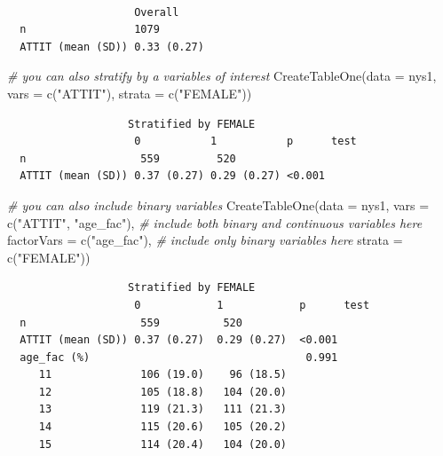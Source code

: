 \documentclass[
  letterpaper,
  DIV=11,
  numbers=noendperiod]{scrreprt}
\newenvironment{Shaded}{}{}
\newcommand{\AttributeTok}[1]{\textcolor[rgb]{0.49,0.56,0.16}{#1}}
\newcommand{\CommentTok}[1]{\textcolor[rgb]{0.38,0.63,0.69}{\textit{#1}}}
\newcommand{\FunctionTok}[1]{\textcolor[rgb]{0.02,0.16,0.49}{#1}}
\newcommand{\NormalTok}[1]{#1}
\newcommand{\StringTok}[1]{\textcolor[rgb]{0.25,0.44,0.63}{#1}}
\begin{document}
\begin{verbatim}
                   
                    Overall    
  n                 1079       
  ATTIT (mean (SD)) 0.33 (0.27)
\end{verbatim}

\begin{Shaded}
\begin{Highlighting}[]
\CommentTok{\# you can also stratify by a variables of interest}
  \FunctionTok{CreateTableOne}\NormalTok{(}\AttributeTok{data =}\NormalTok{ nys1,}
                 \AttributeTok{vars =} \FunctionTok{c}\NormalTok{(}\StringTok{"ATTIT"}\NormalTok{), }
                 \AttributeTok{strata =} \FunctionTok{c}\NormalTok{(}\StringTok{"FEMALE"}\NormalTok{))}
\end{Highlighting}
\end{Shaded}

\begin{verbatim}
                   Stratified by FEMALE
                    0           1           p      test
  n                  559         520                   
  ATTIT (mean (SD)) 0.37 (0.27) 0.29 (0.27) <0.001     
\end{verbatim}

\begin{Shaded}
\begin{Highlighting}[]
\CommentTok{\# you can also include binary variables}
  \FunctionTok{CreateTableOne}\NormalTok{(}\AttributeTok{data =}\NormalTok{ nys1, }
                 \AttributeTok{vars =} \FunctionTok{c}\NormalTok{(}\StringTok{"ATTIT"}\NormalTok{, }\StringTok{"age\_fac"}\NormalTok{),  }\CommentTok{\# include both binary and continuous variables here}
                 \AttributeTok{factorVars =} \FunctionTok{c}\NormalTok{(}\StringTok{"age\_fac"}\NormalTok{), }\CommentTok{\# include only binary variables here}
                 \AttributeTok{strata =} \FunctionTok{c}\NormalTok{(}\StringTok{"FEMALE"}\NormalTok{))}
\end{Highlighting}
\end{Shaded}

\begin{verbatim}
                   Stratified by FEMALE
                    0            1            p      test
  n                  559          520                    
  ATTIT (mean (SD)) 0.37 (0.27)  0.29 (0.27)  <0.001     
  age_fac (%)                                  0.991     
     11              106 (19.0)    96 (18.5)             
     12              105 (18.8)   104 (20.0)             
     13              119 (21.3)   111 (21.3)             
     14              115 (20.6)   105 (20.2)             
     15              114 (20.4)   104 (20.0)             
\end{verbatim}
\end{document}
